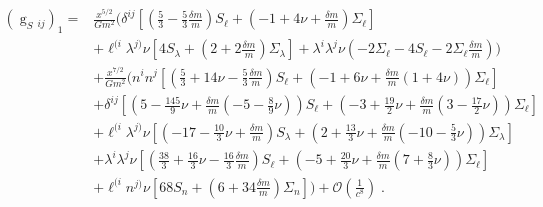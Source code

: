 \begin{align}
\left(\mathop{g}_{S}{}_{ij}\right)_1=&
\frac{x^{5/2}}{G m^2}\Bigg(
\delta^{ij} \left[\left(\frac{5}{3} -\frac{5}{3}\frac{\delta m}{m}\right)S_\ell+\left(-1 + 4 \nu +\frac{\delta m}{m}\right)\Sigma _\ell\right]\nonumber\\
&
+\ell^{(i}\lambda^{j)}\nu\left[4S_{\lambda }+\left(2 +2\frac{\delta m}{m}\right)\Sigma _{\lambda }\right]
+\lambda^{i}\lambda^{j}\nu\left(-2 \Sigma _\ell -4 S_\ell -2 \Sigma _\ell\frac{\delta m}{m}\right)\Bigg)\nonumber\\
&+\frac{x^{7/2}}{G m^2}\Bigg(
n^i n^j \left[\left(\frac{5}{3} + 14 \nu -\frac{5}{3}\frac{\delta m}{m}\right)S_\ell+\left(-1 + 6 \nu+\frac{\delta m}{m}\left(1 + 4 \nu\right)\right)\Sigma _\ell\right]\nonumber\\
&
+\delta^{ij} \left[\left(5 -\frac{145}{9} \nu+\frac{\delta m}{m}\left(-5 -\frac{8}{9} \nu\right)\right)S_\ell+\left(-3 + \frac{19}{2} \nu+\frac{\delta m}{m}\left(3 -\frac{17}{2} \nu\right)\right)\Sigma _\ell\right]\nonumber\\
&
+\ell^{(i}\lambda^{j)}\nu\left[\left(-17 -\frac{10}{3} \nu +\frac{\delta m}{m}\right)S_{\lambda }+\left(2 + \frac{13}{3} \nu+\frac{\delta m}{m}\left(-10 -\frac{5}{3} \nu\right)\right)\Sigma _{\lambda }\right]\nonumber\\
&
+\lambda^{i}\lambda^{j}\nu\left[\left(\frac{38}{3} + \frac{16}{3} \nu -\frac{16}{3}\frac{\delta m}{m}\right)S_\ell+\left(-5 + \frac{20}{3} \nu+\frac{\delta m}{m}\left(7 + \frac{8}{3} \nu\right)\right)\Sigma _\ell\right]\nonumber\\
&
+\ell^{(i} n^{j)} \nu\left[68S_n+\left(6 +34\frac{\delta m}{m}\right)\Sigma _n\right]
\Bigg)+\mathcal{O}\left(\frac{1}{c^8}\right) \;.
\end{align}
